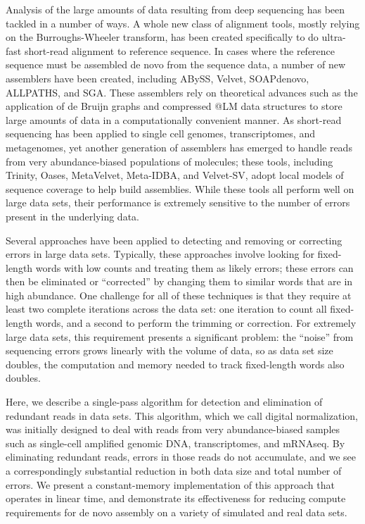 \documentclass[10pt,draft]{article}
\begin{document}
Analysis of the large amounts of data resulting from deep sequencing
has been tackled in a number of ways.  A whole new class of alignment
tools, mostly relying on the Burroughs-Wheeler transform, has been
created specifically to do ultra-fast short-read alignment to
reference sequence.  In cases where the reference sequence must be
assembled de novo from the sequence data, a number of new assemblers
have been created, including ABySS, Velvet, SOAPdenovo, ALLPATHS, and
SGA.  These assemblers rely on theoretical advances such as the
application of de Bruijn graphs and compressed @LM data structures to
store large amounts of data in a computationally convenient manner.
As short-read sequencing has been applied to single cell genomes,
transcriptomes, and metagenomes, yet another generation of assemblers
has emerged to handle reads from very abundance-biased populations of
molecules; these tools, including Trinity, Oases, MetaVelvet,
Meta-IDBA, and Velvet-SV, adopt local models of sequence coverage to
help build assemblies.  While these tools all perform well on large
data sets, their performance is extremely sensitive to the number of
errors present in the underlying data.

Several approaches have been applied to detecting and removing or
correcting errors in large data sets.  Typically, these approaches
involve looking for fixed-length words with low counts and treating
them as likely errors; these errors can then be eliminated or
``corrected'' by changing them to similar words that are in high
abundance.  One challenge for all of these techniques is that they
require at least two complete iterations across the data set: one
iteration to count all fixed-length words, and a second to perform the
trimming or correction.  For extremely large data sets, this
requirement presents a significant problem: the ``noise'' from
sequencing errors grows linearly with the volume of data, so as data
set size doubles, the computation and memory needed to track
fixed-length words also doubles.

Here, we describe a single-pass algorithm for detection and
elimination of redundant reads in data sets.  This algorithm, which we
call digital normalization, was initially designed to deal with reads
from very abundance-biased samples such as single-cell amplified
genomic DNA, transcriptomes, and mRNAseq.  By eliminating redundant
reads, errors in those reads do not accumulate, and we see a
correspondingly substantial reduction in both data size and total
number of errors.  We present a constant-memory implementation of this
approach that operates in linear time, and demonstrate its
effectiveness for reducing compute requirements for de novo assembly
on a variety of simulated and real data sets.
\end{document}

